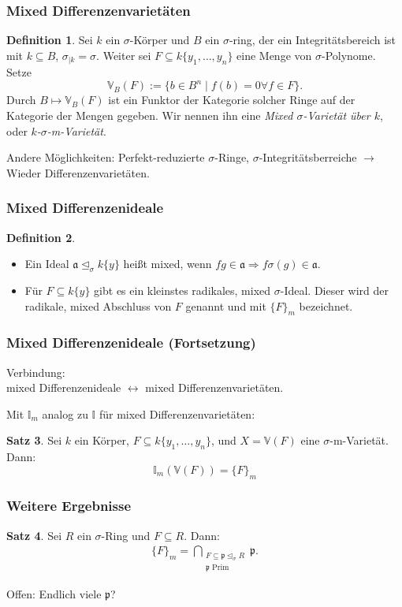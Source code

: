 \documentclass{beamer}
\def\I{\mathbb{I}}
\def\VV{\mathbb{V}}
\def\a{\mathfrak{a}}
\def\p{\mathfrak{p}}
\def\s{\sigma}
\def\si{\unlhd_{\sigma}}
\theoremstyle{definition}
\newtheorem{satz}{Satz}[section]
\newtheorem{defn}[satz]{Definition}
\begin{document}
\begin{frame}\frametitle{Mixed Differenzenvarietäten}

\begin{defn}\label{defnVV}
Sei $k$ ein $\s$-Körper und $B$ ein $\s$-ring, der ein Integritätsbereich ist mit $k \subseteq B$, $\s_{|k} = \s$. Weiter sei $F \subseteq k\{y_1, \ldots, y_n\}$ eine Menge von $\s$-Polynome.
Setze $$\VV_B(F):= \{ b \in B^n \mid f(b) = 0 \forall f \in F \}.$$
Durch $B \mapsto \VV_B(F)$ ist ein Funktor der Kategorie solcher Ringe auf der Kategorie der Mengen gegeben. Wir nennen ihn eine \emph{Mixed $\s$-Varietät über $k$}, oder \emph{$k$-$\s$-m-Varietät}.
\end{defn}
$\phantom{ }$ \\
Andere Möglichkeiten: Perfekt-reduzierte $\s$-Ringe, $\s$-Integritätsberreiche $\rightarrow$ Wieder Differenzenvarietäten.
\end{frame}

\begin{frame}\frametitle{Mixed Differenzenideale}
\begin{defn} 
\begin{itemize}
\item Ein Ideal $\a \si k\{y\}$ heißt mixed, wenn $fg \in \a \Rightarrow f\s(g) \in \a$.
\item Für $F \subseteq k\{y\}$ gibt es ein kleinstes radikales, mixed $\s$-Ideal. Dieser wird
der radikale, mixed Abschluss von $F$ genannt und mit $\{F\}_m$ bezeichnet.
\end{itemize}
\end{defn}
\end{frame}

\begin{frame}\frametitle{Mixed Differenzenideale (Fortsetzung)}
\begin{center} Verbindung: \\  mixed Differenzenideale $\leftrightarrow$ mixed Differenzenvarietäten. \end{center}
Mit $\I_m$ analog zu $\I$ für mixed Differenzenvarietäten: 
\begin{satz}
Sei $k$ ein Körper, $F \subseteq k\{y_1,\ldots,y_n\}$, und $X = \VV(F)$ eine $\s$-m-Varietät. Dann:
\[ \I_m(\VV(F)) = \{ F \}_m \]
\end{satz}
\end{frame}

\begin{frame}\frametitle{Weitere Ergebnisse}
\begin{satz}\label{intersectionprimes}
Sei $R$ ein $\s$-Ring und $F \subseteq R$. Dann:
\begin{align*} \{F\}_m = \bigcap_{\substack{F \subseteq \p \si R \\ \p \text{ Prim}}} \p. \end{align*}
\end{satz}
Offen: Endlich viele $\p$?
\end{frame}
\end{document}
